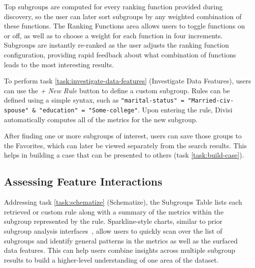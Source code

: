 Top subgroups are computed for every ranking function provided during discovery, so the user can later sort subgroups by any weighted combination of these functions.
The Ranking Functions area allows users to toggle functions on or off, as well as to choose a weight for each function in four increments.
Subgroups are instantly re-ranked as the user adjusts the ranking function configuration, providing rapid feedback about what combination of functions leads to the most interesting results.

To perform task \ref{task:investigate-data-features} (Investigate Data Features), users can use the \textit{+ New Rule} button to define a custom subgroup.
Rules can be defined using a simple syntax, such as \texttt{"marital-status" = "Married-civ-spouse" \& "education" = "Some-college"}.
Upon entering the rule, Divisi automatically computes all of the metrics for the new subgroup.

After finding one or more subgroups of interest, users can save those groups to the Favorites, which can later be viewed separately from the search results. This helps in building a case that can be presented to others (task \ref{task:build-case}).

\subsection{Assessing Feature Interactions}
\label{sec:vis-evaluation}

Addressing task \ref{task:schematize} (Schematize), the Subgroups Table lists each retrieved or custom rule along with a summary of the metrics within the subgroup represented by the rule.
Sparkline-style charts, similar to prior subgroup analysis interfaces~\cite{kahng_visual_2016,zhang_sliceteller_2022}, allow users to quickly scan over the list of subgroups and identify general patterns in the metrics as well as the surfaced data features.
This can help users combine insights across multiple subgroup results to build a higher-level understanding of one area of the dataset.

